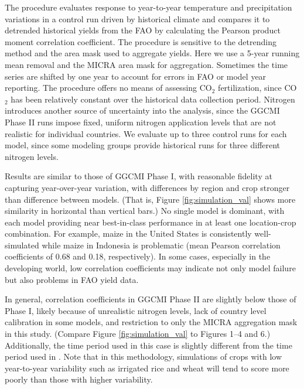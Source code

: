 \documentclass[gmd, manuscript]{copernicus} %
\begin{document}
The \citet{muller_global_2017} procedure evaluates response to year-to-year temperature and precipitation variations in a control run driven by historical climate and compares it to detrended historical yields from the FAO \citep{FAOSTAT} by calculating the Pearson product moment correlation coefficient. The procedure is sensitive to the detrending method and the area mask used to aggregate yields. Here we use a 5-year running mean removal and the MICRA area mask for aggregation. Sometimes the time series are shifted by one year to account for errors in FAO or model year reporting. The procedure offers no means of assessing CO$_2$ fertilization, since CO$_2$ has been relatively constant over the historical data collection period. Nitrogen introduces another source of uncertainty into the analysis, since the GGCMI Phase II runs impose fixed, uniform nitrogen application levels that are not realistic for individual countries. We evaluate up to three control runs for each model, since some modeling groups provide historical runs for three different nitrogen levels. 

Results are similar to those of GGCMI Phase I, with reasonable fidelity at capturing year-over-year variation, with differences by region and crop stronger than difference between models. (That is, Figure \ref{fig:simulation_val} shows more similarity in horizontal than vertical bars.) No single model is dominant, with each model providing near best-in-class performance in at least one location-crop combination. For example, maize in the United States is consistently well-simulated while maize in Indonesia is problematic (mean Pearson correlation coefficients of 0.68 and 0.18, respectively). In some cases, especially in the developing world, low correlation coefficients may indicate not only model failure but also problems in FAO yield data. 

In general, correlation coefficients in GGCMI Phase II are slightly below those of Phase I, likely because of unrealistic nitrogen levels, lack of country level calibration in some models, and restriction to only the MICRA aggregation mask in this study. (Compare Figure \ref{fig:simulation_val} to \citet{muller_global_2017} Figures 1--4 and 6.)  Additionally, the time period used in this case is slightly different from the time period used in \citet{muller_global_2017}. Note that in this methodology, simulations of crops with low year-to-year variability such as irrigated rice and wheat will tend to score more poorly than those with higher variability.
\end{document}
